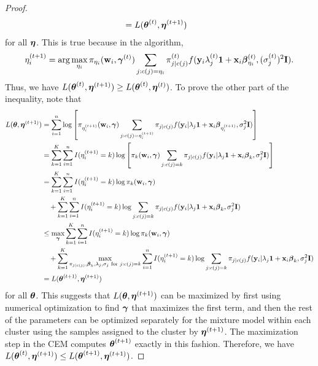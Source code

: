 \begin{proof}
\begin{align*}
  &= L(\boldsymbol\theta^{(t)},\boldsymbol\eta^{(t+1)})
    \end{align*}
for all $\boldsymbol\eta$. This is true because in the algorithm, $$\eta^{(t+1)}_{i} = \arg \max_{\eta_{i}} \pi_{\eta_{i}}(\mathbf w_{i},\boldsymbol \gamma^{(t)})\sum_{j:c(j)=\eta_{i}}\pi_{j|c(j)}^{(t)}f(\mathbf y_{i}\lambda_{j}^{(t)}\mathbf 1+\mathbf x_{i}\boldsymbol\beta^{(t)}_{\eta_{i}},(\sigma^{(t)}_{j})^{2}\mathbf I).$$
   Thus, we have $    L(\boldsymbol\theta^{(t)},\boldsymbol\eta^{(t+1)})\geq L(\boldsymbol\theta^{(t)},\boldsymbol\eta^{(t)})$. To prove the other part of the inequality, note that
       \begin{align*}
 L(\boldsymbol\theta,\boldsymbol\eta^{(t+1)})  &= \sum^{n}_{i=1}\log\left[\pi_{\eta^{(t+1)}_{i}}(\mathbf w_{i},\boldsymbol \gamma)\sum_{j:c(j)=\eta^{(t+1)}_{i}}\pi_{j|c(j)}f(\mathbf y_{i}|\lambda_{j}\mathbf 1+\mathbf x_{i}\boldsymbol\beta_{\eta^{(t+1)}_{i}},\sigma_{j}^{2}\mathbf I)\right]\\
 &= \sum^{K}_{k=1}\sum^{n}_{i=1}I(\eta^{(t+1)}_{i} = k)\log\left[\pi_{k}(\mathbf w_{i},\boldsymbol \gamma)\sum_{j:c(j)=k}\pi_{j|c(j)}f(\mathbf y_{i}|\lambda_{j}\mathbf 1+\mathbf x_{i}\boldsymbol\beta_{k},\sigma_{j}^{2}\mathbf I)\right]\\
  &= \sum^{K}_{k=1}\sum^{n}_{i=1}I(\eta^{(t+1)}_{i} = k)\log\pi_{k}(\mathbf w_{i},\boldsymbol \gamma)\\
  &\quad+\sum^{K}_{k=1}\sum^{n}_{i=1}I(\eta^{(t+1)}_{i} = k)\log \sum_{j:c(j)=k}\pi_{j|c(j)}f(\mathbf y_{i}|\lambda_{j}\mathbf 1+\mathbf x_{i}\boldsymbol\beta_{k},\sigma_{j}^{2}\mathbf I)\\
    &\leq\max_{\boldsymbol\gamma} \sum^{K}_{k=1}\sum^{n}_{i=1}I(\eta^{(t+1)}_{i} = k)\log\pi_{k}(\mathbf w_{i},\boldsymbol \gamma)\\
  &\quad+\sum^{K}_{k=1}\max_{\pi_{j|c(j)},\boldsymbol\beta_{k},\lambda_{j},\sigma_{j}\text{ for }j:c(j)=k}\sum^{n}_{i=1}I(\eta^{(t+1)}_{i} = k)\log \sum_{j:c(j)=k}\pi_{j|c(j)}f(\mathbf y_{i}|\lambda_{j}\mathbf 1+\mathbf x_{i}\boldsymbol\beta_{k},\sigma^{2}_{j}\mathbf I)\\
  & = L(\boldsymbol\theta^{(t+1)},\boldsymbol\eta^{(t+1)})
    \end{align*}
    for all $\boldsymbol\theta$. This suggests that $L(\boldsymbol\theta,\boldsymbol\eta^{(t+1)})$ can be maximized by first using numerical optimization to find $\boldsymbol\gamma$ that maximizes the first term, and then the rest of the parameters can be optimized separately for the mixture model within each cluster using the samples assigned to the cluster by $\boldsymbol\eta^{(t+1)}$. The maximization step in the CEM computes $\boldsymbol\theta^{(t+1)}$ exactly in this fashion. Therefore, we have $L(\boldsymbol\theta^{(t)},\boldsymbol\eta^{(t+1)})\leq L(\boldsymbol\theta^{(t+1)},\boldsymbol\eta^{(t+1)})$. 
    \end{proof}